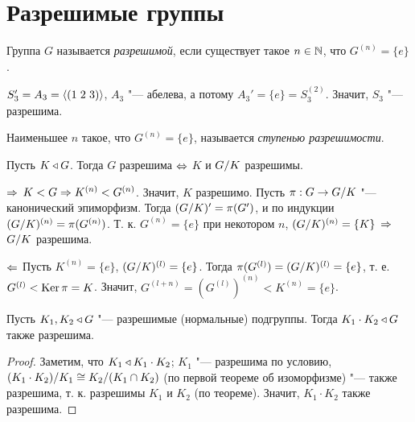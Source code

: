 \documentclass[main]{subfiles}
\begin{document}
\section{Разрешимые группы}
\begin{definition}
  Группа $G$ называется \emph{разрешимой},
  если существует такое $n \in \mathbb{N}$,
  что $G^{(n)} = \{ e \}$.
\end{definition}

\begin{example}
  $S'_3 = A_3 = \langle \Cycle{1&2&3} \rangle$, $A_3$ "--- абелева, а потому $A_3' = \{ e \}
  = S_3^{(2)}$. Значит, $S_3$ "--- разрешима.
\end{example}

\begin{remark}
  Наименьшее $n$ такое, что $G^{(n)} = \{e\}$, называется \emph{ступенью разрешимости}.
\end{remark}

\begin{theorem}
  Пусть $K \triangleleft G$. Тогда $G$ разрешима $\Leftrightarrow$ $K$ и $\Factor{G}[K]$ разрешимы.
\end{theorem}
\begin{itemproof}
  \item[$\Rightarrow$] $K < G \Rightarrow K^{(n)} < G^{(n)}$. Значит, $K$ разрешимо.
    Пусть $\pi : G \to \Factor{G}[K]$ "--- канонический эпиморфизм. Тогда
    $(\Factor{G}[K])' = \pi(G')$, и по индукции $(\Factor{G}[K])^{(n)} = \pi(G^{(n)})$.
    Т. к. $G^{(n)} = \{ e \}$ при некотором $n$, $(\Factor{G}[K])^{(n)} = \{ K \}$ $\Rightarrow$
    $\Factor{G}[K]$ разрешима.
  \item[$\Leftarrow$] Пусть $K^{(n)} = \{ e \}$, $(\Factor{G}[K])^{(l)} = \{ e \}$.
    Тогда $\pi(G^{(l)}) = (\Factor{G}[K])^{(l)} = \{e \}$,
    т. е. $G^{(l)} < \operatorname{Ker} \pi = K$.
    Значит, $G^{(l+n)} = (G^{(l)})^{(n)} < K^{(n)} = \{ e \}$.
\end{itemproof}

\begin{corollary}
  Пусть $K_1, K_2 \triangleleft G$ "--- разрешимые (нормальные) подгруппы. Тогда
  $K_1 \cdot K_2 \triangleleft G$ также разрешима.
\end{corollary}
\begin{proof}
  Заметим, что $K_1 \triangleleft K_1 \cdot K_2$; $K_1$ "--- разрешима по условию,
  $\Factor{(K_1 \cdot K_2)}[K_1] \cong
  \Factor{K_2}[(K_1 \cap K_2)]$
  (по первой теореме об изоморфизме) "---
  также разрешима, т. к. разрешимы $K_1$
  и \( K_2 \) (по теореме).
  Значит, $K_1 \cdot K_2$ также разрешима.
\end{proof}
\end{document}
